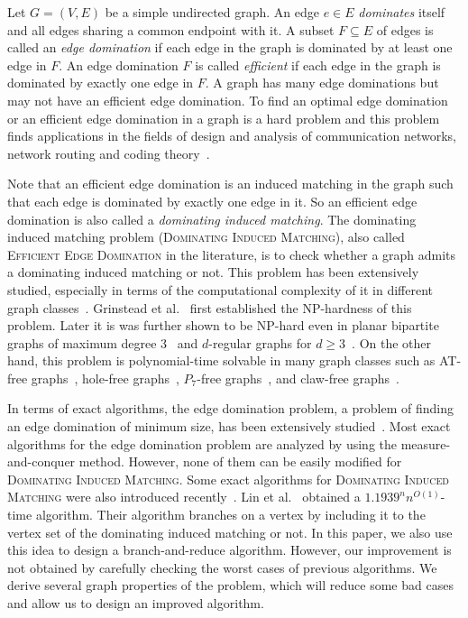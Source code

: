 \documentclass{elsart_TR2}
\begin{document}
Let $G=(V,E)$ be a simple undirected graph. An edge $e\in E$ \emph{dominates} itself and all edges sharing a common endpoint with it.
A subset $F\subseteq E$ of edges is called an \emph{edge domination} if each edge in the graph is dominated by at least one edge in $F$.
An edge domination $F$ is called \emph{efficient} if each edge in the graph is dominated by exactly one edge in $F$.
A graph has many edge dominations but may not have an efficient edge domination.
To  find an optimal edge domination or an efficient edge domination in a graph is a hard problem and this problem finds
applications in the fields of design and analysis of communication networks, network routing and coding theory~\cite{CCDS:EEDRegularGraph,GSSH:EED}.

Note that an efficient edge domination is an induced matching in the graph such that each  edge is dominated by exactly one edge in it.
So an efficient edge domination is also called a \emph{dominating induced matching}. The dominating induced matching problem (\textsc{Dominating Induced Matching}),
also called \textsc{Efficient Edge Domination} in the literature, is to check whether a graph admits a dominating induced matching or not. This problem has been extensively studied, especially
in terms of the computational complexity of it in different graph
 classes~\cite{BHN:EEDhole-free,BM:DIMp7,CKL:DIM,GSSH:EED,PandEED,EED:bpermutation}.
Grinstead et al.~\cite{GSSH:EED} first established the NP-hardness of this problem.
Later it is was further shown to be NP-hard even in planar bipartite graphs of maximum degree 3~\cite{BHN:EEDhole-free} and $d$-regular graphs for $d\geq3$~\cite{CCDS:EEDRegularGraph}.
On the other hand, this problem is polynomial-time solvable in  many graph classes such as
AT-free graphs~\cite{BLR:EEDhypergraph}, hole-free graphs~\cite{BHN:EEDhole-free}, $P_7$-free graphs~\cite{BM:DIMp7},
and claw-free graphs~\cite{CKL:DIM}.

In terms of exact algorithms, the edge domination problem,
a problem of finding an edge domination of minimum size, has been extensively studied~\cite{kn:rooij,xn:eds}. Most exact algorithms for the edge domination problem are analyzed by using the measure-and-conquer method. However, none of them can be easily modified for
\textsc{Dominating Induced Matching}.
Some exact algorithms for \textsc{Dominating Induced Matching} were also introduced recently~\cite{LMS:DIMexact,LMS:DIMexact_odd}. Lin et al.~\cite{LMS:DIMexact} obtained a $1.1939^nn^{O(1)}$-time algorithm. Their algorithm branches on a vertex by including it to the vertex set of the dominating induced matching or not.
In this paper, we also use this idea to design a branch-and-reduce algorithm. However, our improvement is not obtained by carefully
checking the worst cases of previous algorithms. We derive several graph properties of the problem, which will reduce some bad cases and allow us to design an improved algorithm.
\end{document}
